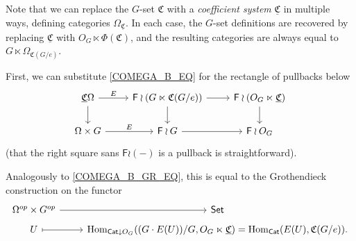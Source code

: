 \documentclass[a4paper,10pt
,draft
]{article}%
\newcommand{\UC}{\underline{\mathfrak C}}
\renewcommand{\1}{\ensuremath{\mathbb{id}}}
\begin{document}
\begin{remark}
      Note that we can replace the $G$-set $\mathfrak C$ with a
      \textit{coefficient system} $\underline{\mathfrak C}$ in multiple ways,
      defining categories $\Omega_{\UC}$.
      In each case, the $G$-set definitions are recovered by replacing $\UC$ with $O_G \ltimes \Phi(\mathfrak C)$,
      and the resulting categories are always equal to $G \ltimes \Omega_{\mathfrak C(G/e)}$.

      
      First, we can substitute \eqref{COMEGA_B_EQ} for the rectangle of pullbacks below
      \begin{equation}
            \label{COMEGA_OG_EQ}
            \begin{tikzcd}
                  \underline{\mathfrak C}\Omega \arrow[d] \arrow[r, "E"]
                  &
                  \mathsf F \wr (G \ltimes \mathfrak C(G/e)) \arrow[r] \arrow[d]
                  &
                  \mathsf F \wr (O_G \ltimes \UC) \arrow[d]
                  \\
                  \Omega \times G \arrow[r, "E"]
                  &
                  \mathsf F \wr G \arrow[r]
                  &
                  \mathsf F \wr O_G
            \end{tikzcd}
      \end{equation}
      (that the right square sans $\mathsf F \wr (-)$ is a pullback is straightforward).

      Analogously to \eqref{COMEGA_B_GR_EQ}, this is equal to the Grothendieck construction on the functor
      \begin{equation}
            \label{COMEGA_OG_GR_EQ}
            \begin{tikzcd}[row sep = tiny]
                  \Omega^{op} \times G^{op} \arrow[r]
                  &
                  \mathsf{Set}
                  \\
                  U \arrow[r, mapsto]
                  &
                  \Hom_{\mathsf{Cat} \downarrow O_G}((G \cdot E(U))/G, O_G \ltimes \UC)
                  =
                  \Hom_{\mathsf{Cat}}(E(U), \mathfrak C(G/e)).
            \end{tikzcd}
      \end{equation}


\end{remark}
\end{document}
